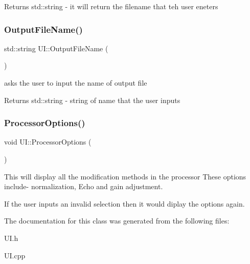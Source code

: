 \begin{DoxyReturn}{Returns}
std\+::string -\/ it will return the filename that teh user eneters 
\end{DoxyReturn}
\mbox{\label{classUI_ad5a96cf0e114c4dac4a4d7958dd98c4a}} 
\subsubsection{\texorpdfstring{Output\+File\+Name()}{OutputFileName()}}
{\footnotesize\ttfamily std\+::string U\+I\+::\+Output\+File\+Name (\begin{DoxyParamCaption}{ }\end{DoxyParamCaption})}



asks the user to input the name of output file 

\begin{DoxyReturn}{Returns}
std\+::string -\/ string of name that the user inputs 
\end{DoxyReturn}
\mbox{\label{classUI_a3af627515035a845a98b24d7463da5dc}} 
\subsubsection{\texorpdfstring{Processor\+Options()}{ProcessorOptions()}}
{\footnotesize\ttfamily void U\+I\+::\+Processor\+Options (\begin{DoxyParamCaption}{ }\end{DoxyParamCaption})\hspace{0.3cm}{\ttfamily [static]}}



This will display all the modification methods in the processor These options include-\/ normalization, Echo and gain adjustment. 

If the user inputs an invalid selection then it would diplay the options again.

The documentation for this class was generated from the following files\+:\begin{DoxyCompactItemize}
\item 
U\+I.\+h\item 
U\+I.\+cpp\end{DoxyCompactItemize}
